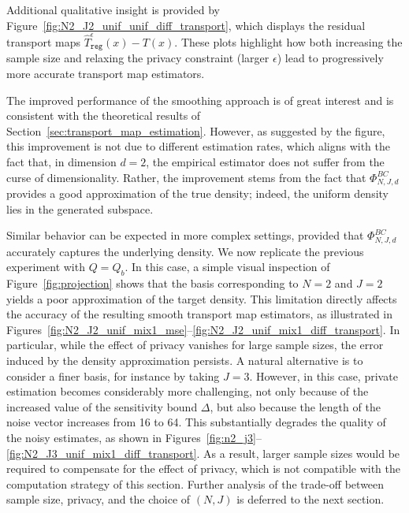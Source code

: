 \documentclass{article}
\newcommand{\1}{\mathds{1}}
\theoremstyle{plain}
\theoremstyle{definition}
\theoremstyle{remark}
\begin{document}
Additional qualitative insight is provided by Figure~\ref{fig:N2_J2_unif_unif_diff_transport}, which displays the residual transport maps $\hat T_\texttt{reg}^\epsilon(x) - T(x)$. These plots highlight how both increasing the sample size and relaxing the privacy constraint (larger $\epsilon$) lead to progressively more accurate transport map estimators.

The improved performance of the smoothing approach is of great interest and is consistent with the theoretical results of Section~\ref{sec:transport_map_estimation}. 
However, as suggested by the figure, this improvement is not due to different estimation rates, which aligns with the fact that, in dimension $d = 2$, the empirical estimator does not suffer from the curse of dimensionality. 
Rather, the improvement stems from the fact that $\Phi_{N,J,d}^{BC}$ provides a good approximation of the true density; indeed, the uniform density lies in the generated subspace.



Similar behavior can be expected in more complex settings, provided that  $\Phi_{N,J,d}^{BC}$ accurately captures the underlying density. 
We now replicate the previous experiment with $Q = Q_b$. 
In this case, a simple visual inspection of Figure~\ref{fig:projection} shows that the basis corresponding to $N = 2$ and $J = 2$ yields a poor approximation of the target density.
This limitation directly affects the accuracy of the resulting smooth transport map estimators, as illustrated in Figures~\ref{fig:N2_J2_unif_mix1_mse}--\ref{fig:N2_J2_unif_mix1_diff_transport}. 
In particular, while the effect of privacy vanishes for large sample sizes, the error induced by the density approximation persists.
A natural alternative is to consider a finer basis, for instance by taking $J = 3$. 
However, in this case, private estimation becomes considerably more challenging, not only because of the increased value of the sensitivity bound $\Delta$, but also because the length of the noise vector increases from 16 to 64. 
This substantially degrades the quality of the noisy estimates, as shown in Figures~\ref{fig:n2_j3}--\ref{fig:N2_J3_unif_mix1_diff_transport}. 
As a result, larger sample sizes would be required to compensate for the effect of privacy, which is not compatible with the computation strategy of this section.
Further analysis of the trade-off between sample size, privacy, and the choice of $(N,J)$ is deferred to the next section.
\end{document}
